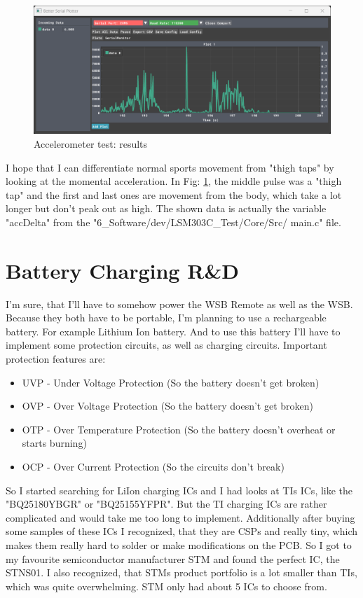 \begin{figure}[H]
	\centering
	\includegraphics[width=17cm]{Resources/accTestMeas.png}
	\caption{Accelerometer test: results}
	\label{fig:accTestMeas}
\end{figure}

I hope that I can differentiate normal sports movement from "thigh taps" by looking at the momental acceleration. In Fig: \ref{fig:accTestMeas}, the middle pulse was a "thigh tap" and the first and last ones are movement from the body, which take a lot longer but don't peak out as high. The shown data is actually the variable "accDelta" from the "6\_Software/dev/LSM303C\_Test/Core/Src/ main.c" file.

\section{Battery Charging R\&D}
\label{sec:Battery Charging}
I'm sure, that I'll have to somehow power the WSB Remote as well as the WSB. Because they both have to be portable, I'm planning to use a rechargeable battery. For example Lithium Ion battery. And to use this battery I'll have to implement some protection circuits, as well as charging circuits. Important protection features are:
\begin{itemize}
    \item UVP - Under Voltage Protection (So the battery doesn't get broken)
    \item OVP - Over Voltage Protection (So the battery doesn't get broken)
    \item OTP - Over Temperature Protection (So the battery doesn't overheat or starts burning)
    \item OCP - Over Current Protection (So the circuits don't break)
\end{itemize}

So I started searching for LiIon charging ICs and I had looks at TIs ICs, like the "BQ25180YBGR" or "BQ25155YFPR". But the TI charging ICs are rather complicated and would take me too long to implement. Additionally after buying some samples of these ICs I recognized, that they are CSPs and really tiny, which makes them really hard to solder or make modifications on the PCB. So I got to my favourite semiconductor manufacturer STM and found the perfect IC, the STNS01. I also recognized, that STMs product portfolio is a lot smaller than TIs, which was quite overwhelming. STM only had about 5 ICs to choose from.



